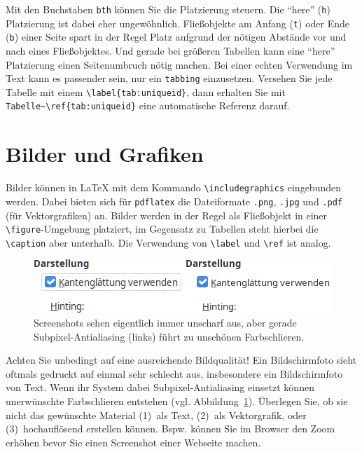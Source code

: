 Mit den Buchstaben \texttt{bth} können Sie die
Platzierung steuern. Die \enquote{here} (\texttt{h}) Platzierung ist dabei eher ungewöhnlich.
Fließobjekte am Anfang (\texttt{t}) oder Ende (\texttt{b}) einer Seite spart in der Regel Platz
aufgrund der nötigen Abstände vor und nach eines Fließobjektes.
Und gerade bei größeren Tabellen kann eine \enquote{here} Platzierung einen Seitenumbruch nötig machen.
Bei einer echten Verwendung im Text kann es passender sein, nur ein \texttt{tabbing} einzusetzen.
Versehen Sie jede Tabelle mit einem \texttt{\textbackslash{}label\{tab:uniqueid\}},
dann erhalten Sie mit \texttt{Tabelle\textasciitilde{}\textbackslash{}ref\{tab:uniqueid\}}
eine automatische Referenz darauf.

\section{Bilder und Grafiken}

Bilder können in \LaTeX{} mit dem Kommando \texttt{\textbackslash{}includegraphics} eingebunden werden.
Dabei bieten sich für \texttt{pdflatex} die Dateiformate \texttt{.png},
\texttt{.jpg} und \texttt{.pdf} (für Vektorgrafiken) an.
Bilder werden in der Regel als Fließobjekt in einer \texttt{\textbackslash{}figure}-Umgebung
platziert, im Gegensatz zu Tabellen steht hierbei die \texttt{\textbackslash{}caption}
aber unterhalb. Die Verwendung von \texttt{\textbackslash{}label} und \texttt{\textbackslash{}ref} ist analog.

\begin{figure}[bt!h]\centering
\includegraphics[width=.8\textwidth]{bilder/schlechte-qualitaet.png}
\caption{Screenshots sehen eigentlich immer unscharf aus, aber gerade Subpixel-Antialiasing (links) führt zu unschönen Farbschlieren.}
\label{fig:screenshots}
\end{figure}

Achten Sie unbedingt auf eine ausreichende Bildqualität!
Ein Bildschirmfoto sieht oftmals gedruckt auf einmal sehr schlecht aus, insbesondere ein Bildschirmfoto von Text.
Wenn ihr System dabei Subpixel-Antialiasing einsetzt können unerwünschte Farbschlieren entstehen (vgl.{} Abbildung~\ref{fig:screenshots}).
Überlegen Sie, ob sie nicht das gewünschte Material (1)~als Text, (2)~als Vektorgrafik, oder (3)~hochauflösend erstellen können. Bspw.{} können Sie im Browser den Zoom erhöhen bevor Sie einen Screenshot einer Webseite machen.

